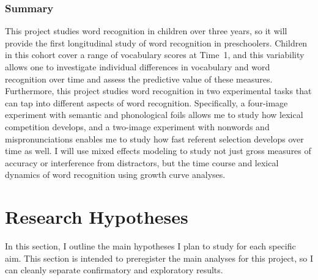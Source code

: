 \documentclass [11pt, proquest] {uwthesis}[2015/03/03]
\begin{document}
\subsection{Summary}\label{summary-1}

This project studies word recognition in children over three years, so
it will provide the first longitudinal study of word recognition in
preschoolers. Children in this cohort cover a range of vocabulary scores
at Time~1, and this variability allows one to investigate individual
differences in vocabulary and word recognition over time and assess the
predictive value of these measures. Furthermore, this project studies
word recognition in two experimental tasks that can tap into different
aspects of word recognition. Specifically, a four-image experiment with
semantic and phonological foils allows me to study how lexical
competition develops, and a two-image experiment with nonwords and
mispronunciations enables me to study how fast referent selection
develops over time as well. I will use mixed effects modeling to study
not just gross measures of accuracy or interference from distractors,
but the time course and lexical dynamics of word recognition using
growth curve analyses.

\chapter{Research Hypotheses}\label{research-hypotheses}

In this section, I outline the main hypotheses I plan to study for each
specific aim. This section is intended to preregister the main analyses
for this project, so I can cleanly separate confirmatory and exploratory
results.
\end{document}
